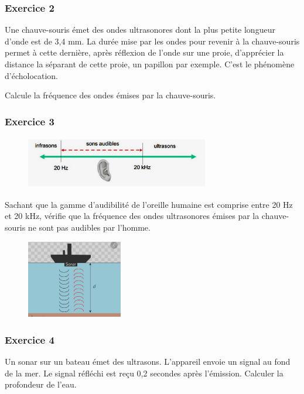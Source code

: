 \begin{multicols}{2}
\subsubsection*{Exercice 2}
  Une chauve-souris émet des ondes ultrasonores dont la plus petite
  longueur d'onde est de 3,4 mm. La durée mise par les ondes pour
  revenir à la chauve-souris permet à cette dernière, après réflexion de
  l'onde sur une proie, d'apprécier la distance la séparant de cette
  proie, un papillon par exemple. C'est le phénomène d'écholocation.

  Calcule la fréquence des ondes émises par la chauve-souris.

\subsubsection*{Exercice 3}

\begin{figure}
\centering
\includegraphics[width=7.996cm,height=2.281cm]{Pictures/10000001000001AC00000071A28062AB920FD735.png}
\caption{}
\end{figure}

  Sachant que la gamme d'audibilité de l'oreille humaine est comprise
  entre 20 Hz et 20 kHz, vérifie que la fréquence des ondes ultrasonores
  émises par la chauve-souris ne sont pas audibles par l'homme.

\begin{figure}
\centering
\includegraphics[width=4.186cm,height=3.41cm]{Pictures/1000000100000131000000F942C9C097631D2C4A.png}
\caption{}
\end{figure}

\subsubsection*{Exercice 4}

  Un sonar sur un bateau émet des ultrasons. L'appareil envoie un signal
  au fond de la mer. Le signal réfléchi est reçu 0,2 secondes après
  l'émission. Calculer la profondeur de l'eau.


\end{multicols}
